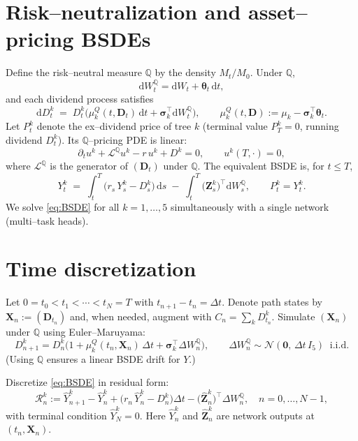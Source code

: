 \documentclass[11pt]{article}
\newcommand{\1}{\mathbbm{1}}
\newcommand{\dd}{\mathrm{d}}
\newcommand{\dt}{\Delta t}
\newcommand{\dwt}{\Delta W^{\mathbb{Q}}}
\newcommand{\wh}{\widehat}
\newcommand{\bs}{\boldsymbol}
\begin{document}
\section{Risk--neutralization and asset--pricing BSDEs}
Define the risk--neutral measure \(\mathbb{Q}\) by the density \(M_t/M_0\). Under \(\mathbb{Q}\),
\begin{equation}
  \dd W_t^{\mathbb{Q}} = \dd W_t + \bs\theta_t\,\dd t,
\end{equation}
and each dividend process satisfies
\begin{equation}\label{eq:D-under-Q}
  \dd D^k_t \;=\; D^k_t\Big( \mu^Q_k(t,\bs D_t)\,\dd t + \bs\sigma_k^\top \dd W_t^{\mathbb{Q}}\Big),\qquad
  \mu^Q_k(t,\bs D) := \mu_k - \bs\sigma_k^\top \bs\theta_t.
\end{equation}
Let \(P^k_t\) denote the ex--dividend price of tree \(k\) (terminal value \(P^k_T=0\), running dividend \(D^k_t\)). Its \(\mathbb{Q}\)--pricing PDE is linear:
\begin{equation}\label{eq:PDE}
  \partial_t u^k + \mathcal{L}^{\mathbb{Q}} u^k - r\,u^k + D^k = 0,\qquad u^k(T,\cdot)=0,
\end{equation}
where \(\mathcal{L}^{\mathbb{Q}}\) is the generator of \((\bs D_t)\) under \(\mathbb{Q}\). The equivalent BSDE is, for \(t\le T\),
\begin{equation}\label{eq:BSDE}
  Y^{k}_t 
  \;=\; 
  \int_t^T \Big( r_s\,Y^{k}_s - D^k_s\Big)\,\dd s \;-\; \int_t^T \big(\bs Z^{k}_s\big)^\top \dd W^{\mathbb{Q}}_s,
  \qquad P^k_t = Y^k_t.
\end{equation}
We solve \eqref{eq:BSDE} for all \(k=1,\dots,5\) simultaneously with a single network (multi--task heads).

\section{Time discretization}
Let \(0=t_0<t_1<\cdots<t_N=T\) with \(t_{n+1}-t_n=\dt\). Denote path states by \(\bs X_n:=(\bs D_{t_n})\) and, when needed, augment with \(C_n=\sum_k D^k_{t_n}\). Simulate \((\bs X_n)\) under \(\mathbb{Q}\) using Euler--Maruyama:
\begin{equation}\label{eq:forward-euler}
  D^k_{n+1} = D^k_n\Big(1 + \mu^Q_k(t_n,\bs X_n)\,\dt + \bs\sigma_k^\top \dwt_n \Big),\qquad
  \dwt_n \sim \mathcal{N}(\bs 0,\,\dt\, I_5)\ \text{ i.i.d.}
\end{equation}
(Using \(\mathbb{Q}\) ensures a linear BSDE drift for \(Y\).)

Discretize \eqref{eq:BSDE} in residual form:
\begin{equation}\label{eq:bsde-resid}
  \mathcal{R}^{k}_n 
   := \wh Y^k_{n+1} - \wh Y^k_{n} + \Big(r_n\,\wh Y^k_n - D^k_n\Big)\dt - \big(\wh{\bs Z}^{k}_n\big)^\top \dwt_n,
  \quad n=0,\dots,N-1,
\end{equation}
with terminal condition \(\wh Y^k_N = 0\). Here \(\wh Y^k_n\) and \(\wh{\bs Z}^k_n\) are network outputs at \((t_n,\bs X_n)\).
\end{document}
